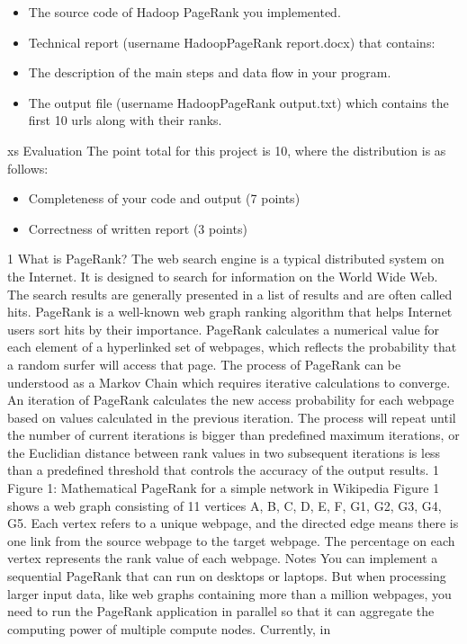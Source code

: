 \begin{itemize}
\item The source code of Hadoop PageRank you implemented.
\item Technical report (username HadoopPageRank report.docx) that contains:
\item The description of the main steps and data flow in your program.
\item The output file (username HadoopPageRank output.txt) which contains the first 10 urls along with
their ranks.
\end{itemize}
xs
Evaluation
The point total for this project is 10, where the distribution is as follows:
\begin{itemize}
\item Completeness of your code and output (7 points)
\item Correctness of written report (3 points)
\end{itemize}
1 What is PageRank?
The web search engine is a typical distributed system on the Internet. It is designed to search for information
on the World Wide Web. The search results are generally presented in a list of results and are often called
hits. PageRank is a well-known web graph ranking algorithm that helps Internet users sort hits by their
importance.
PageRank calculates a numerical value for each element of a hyperlinked set of webpages, which reflects
the probability that a random surfer will access that page. The process of PageRank can be understood as a
Markov Chain which requires iterative calculations to converge. An iteration of PageRank calculates the new
access probability for each webpage based on values calculated in the previous iteration. The process will
repeat until the number of current iterations is bigger than predefined maximum iterations, or the Euclidian
distance between rank values in two subsequent iterations is less than a predefined threshold that controls
the accuracy of the output results.
1
Figure 1: Mathematical PageRank for a simple network in Wikipedia
Figure 1 shows a web graph consisting of 11 vertices A, B, C, D, E, F, G1, G2, G3, G4, G5. Each vertex
refers to a unique webpage, and the directed edge means there is one link from the source webpage to the
target webpage. The percentage on each vertex represents the rank value of each webpage.
Notes
You can implement a sequential PageRank that can run on desktops or laptops. But when processing
larger input data, like web graphs containing more than a million webpages, you need to run the PageRank
application in parallel so that it can aggregate the computing power of multiple compute nodes. Currently, in
